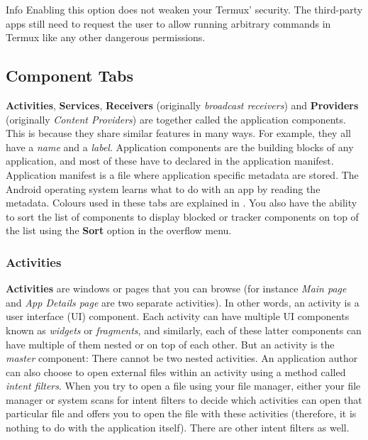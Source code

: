 \begin{tip}{Info}
    Enabling this option does not weaken your Termux' security. The third-party apps still need to request the user to
    allow running arbitrary commands in Termux like any other dangerous permissions.
\end{tip}

\subsection{Component Tabs}\label{subsec:component-tabs}
\textbf{Activities}, \textbf{Services}, \textbf{Receivers} (originally \textit{broadcast receivers}) and
\textbf{Providers} (originally \textit{Content Providers}) are together called the application components. This is
because they share similar features in many ways. For example, they all have a \textit{name} and a \textit{label}.
Application components are the building blocks of any application, and most of these have to declared in the application
manifest. Application manifest is a file where application specific metadata are stored. The Android operating system
learns what to do with an app by reading the metadata. Colours used in these tabs are explained in
. You also have the ability to sort the list of components to display blocked or
tracker components on top of the list using the \textbf{Sort} option in the overflow menu.

\subsubsection{Activities}\label{subsubsec:activities}
\textbf{Activities} are windows or pages that you can browse (for instance \textit{Main page} and \textit{App Details
page} are two separate activities). In other words, an activity is a user interface (UI) component. Each activity can
have multiple UI components known as \textit{widgets} or \textit{fragments}, and similarly, each of these latter
components can have multiple of them nested or on top of each other. But an activity is the \textit{master} component:
There cannot be two nested activities. An application author can also choose to open external files within an activity
using a method called \textit{intent filters}. When you try to open a file using your file manager, either your file
manager or system scans for intent filters to decide which activities can open that particular file and offers you to
open the file with these activities (therefore, it is nothing to do with the application itself). There are other intent
filters as well.

